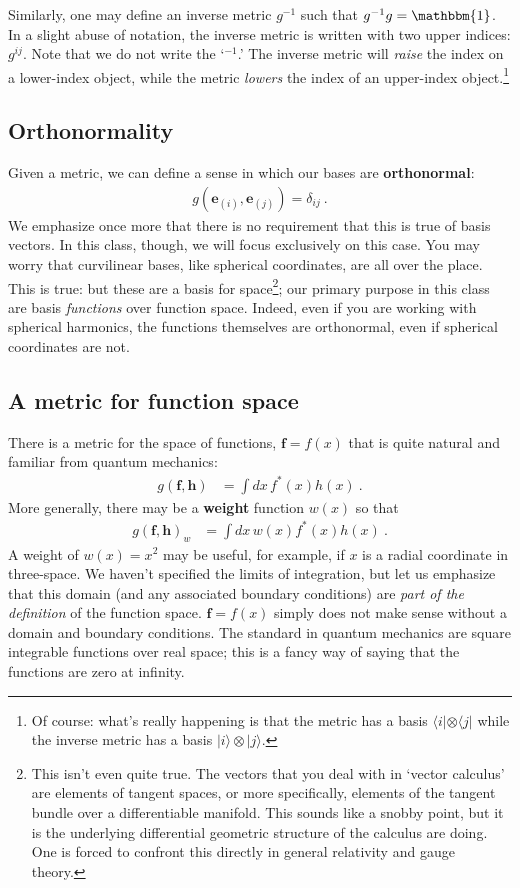 \documentclass[12pt]{article}
\numberwithin{equation}{section}    %
\renewcommand{\vec}[1]{\mathbf{#1}} %
\begin{document}
Similarly, one may define an inverse metric $g^{-1}$ such that $g^{-1}g = \mathbbm{1}$. In a slight abuse of notation, the inverse metric is written with two upper indices: $g^{ij}$. Note that we do not write the `$^{-1}$.' The inverse metric will \emph{raise} the index on a lower-index object, while the metric \emph{lowers} the index of an upper-index object.\footnote{Of course: what’s really happening is that the metric has a basis $\langle i|\otimes \langle j|$ while the inverse metric has a basis $|i\rangle \otimes |j\rangle$.}


\subsection{Orthonormality}

Given a metric, we can define a sense in which our bases are \textbf{orthonormal}:
\begin{align}
  g\left(\vec{e}_{(i)}, \vec{e}_{(j)} \right) = \delta_{ij} \ .
\end{align}
We emphasize once more that there is no requirement that this is true of basis vectors. In this class, though, we will focus exclusively on this case. You may worry that curvilinear bases, like spherical coordinates, are all over the place. This is true: but these are a basis for space\footnote{This isn’t even quite true. The vectors that you deal with in `vector calculus’ are elements of tangent spaces, or more specifically, elements of the tangent bundle over a differentiable manifold. This sounds like a snobby point, but it is the underlying differential geometric structure of the calculus are doing. One is forced to confront this directly in general relativity and gauge theory.}; our primary purpose in this class are basis \emph{functions} over function space. Indeed, even if you are working with spherical harmonics, the functions themselves are orthonormal, even if spherical coordinates are not. 

\subsection{A metric for function space}

There is a metric for the space of functions, $\vec{f} = f(x)$ that is quite natural and familiar from quantum mechanics:
\begin{align}
  g(\vec f, \vec h) &= \int dx \, f^*(x) h(x) \ .
\end{align}
More generally, there may be a \textbf{weight} function $w(x)$ so that
\begin{align}
  g(\vec f, \vec h)_w &= \int dx \, w(x) f^*(x) h(x) \ .
\end{align}
A weight of $w(x)=x^2$ may be useful, for example, if $x$ is a radial coordinate in three-space. We haven’t specified the limits of integration, but let us emphasize that this domain (and any associated boundary conditions) are \emph{part of the definition} of the function space. $\vec{f}= f(x)$ simply does not make sense without a domain and boundary conditions. The standard in quantum mechanics are square integrable functions over real space; this is a fancy way of saying that the functions are zero at infinity.
\end{document}
